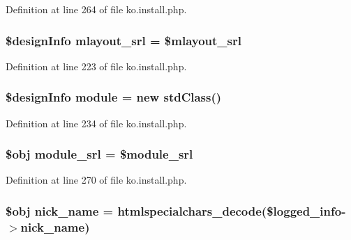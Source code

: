 Definition at line 264 of file ko.\+install.\+php.

\hypertarget{ko_8install_8php_a9cf497537007b08c645bed35f564be54}{}
\subsubsection[{mlayout\+\_\+srl}]{\setlength{\rightskip}{0pt plus 5cm}\$design\+Info mlayout\+\_\+srl = \$mlayout\+\_\+srl}\label{ko_8install_8php_a9cf497537007b08c645bed35f564be54}


Definition at line 223 of file ko.\+install.\+php.

\hypertarget{ko_8install_8php_a5c3fc1968f94c2b6a7c60845f284de78}{}
\subsubsection[{module}]{\setlength{\rightskip}{0pt plus 5cm}\$design\+Info {\bf module} = new std\+Class()}\label{ko_8install_8php_a5c3fc1968f94c2b6a7c60845f284de78}


Definition at line 234 of file ko.\+install.\+php.

\hypertarget{ko_8install_8php_a370bb6450fab1da3e0ed9f484a38b761}{}
\subsubsection[{module\+\_\+srl}]{\setlength{\rightskip}{0pt plus 5cm}\$obj module\+\_\+srl = \$module\+\_\+srl}\label{ko_8install_8php_a370bb6450fab1da3e0ed9f484a38b761}


Definition at line 270 of file ko.\+install.\+php.

\hypertarget{ko_8install_8php_a151ecae87a1f3d7e257aa089803086bd}{}
\subsubsection[{nick\+\_\+name}]{\setlength{\rightskip}{0pt plus 5cm}\$obj nick\+\_\+name = htmlspecialchars\+\_\+decode(\$logged\+\_\+info-\/$>$nick\+\_\+name)}\label{ko_8install_8php_a151ecae87a1f3d7e257aa089803086bd}


